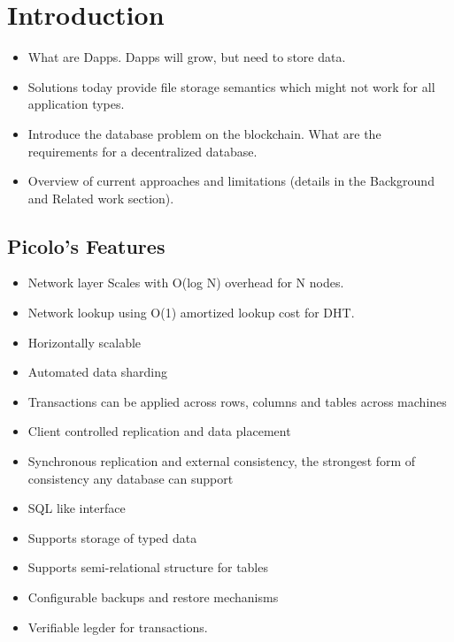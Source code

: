 \documentclass[preprint,12pt]{elsarticle}
\begin{document}
\section{Introduction}\label{Sect:Introduction}


    \begin{itemize}
        \item What are Dapps. Dapps will grow, but need to store data.
        \item Solutions today provide file storage semantics which might not work for all application types.
        \item Introduce the database problem on the blockchain. What are the requirements for a decentralized database.
        \item Overview of current approaches and limitations (details in the Background and Related work section).
    \end{itemize}


\subsection{Picolo's Features}
\begin{itemize}
    \item Network layer Scales with O(log N) overhead for N nodes.
    \item Network lookup using O(1) amortized lookup cost for DHT.
    \item Horizontally scalable 
    \item Automated data sharding
    \item Transactions can be applied across rows, columns and tables across machines
    \item Client controlled replication and data placement
    \item Synchronous replication and external consistency, the strongest form of consistency any database can support
    \item SQL like interface
    \item Supports storage of typed data
    \item Supports semi-relational structure for tables
    \item Configurable backups and restore mechanisms
    \item Verifiable legder for transactions.
\end{itemize}


\end{document}
